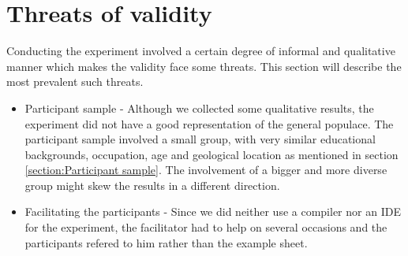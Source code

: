 \section{Threats of validity}
Conducting the experiment involved a certain degree of informal and qualitative manner which makes the validity face some threats. This section will describe the most prevalent such threats.
\begin{itemize}
\item Participant sample - Although we collected some qualitative results, the experiment did not have a good representation of the general populace. The participant sample involved a small group, with very similar educational backgrounds, occupation, age and geological location as mentioned in section \ref{section:Participant sample}. The involvement of a bigger and more diverse group might skew the results in a different direction.
\item Facilitating the participants - Since we did neither use a compiler nor an IDE for the experiment, the facilitator had to help on several occasions and the participants refered to him rather than the example sheet.
\end{itemize}


